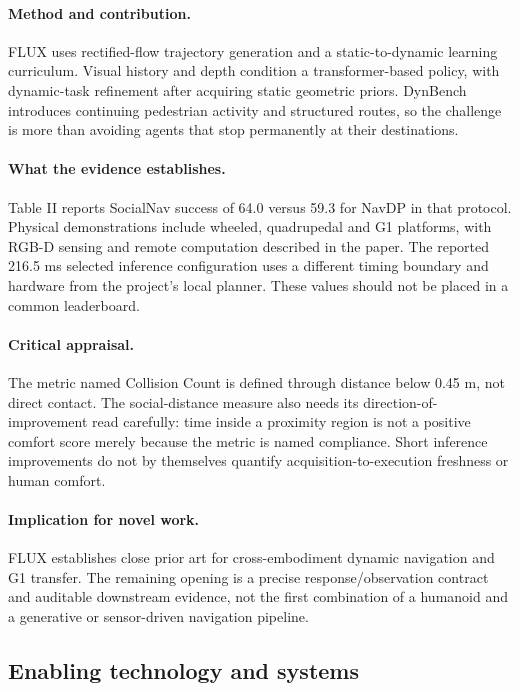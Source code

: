 \paragraph{Method and contribution.} FLUX uses rectified-flow trajectory generation and a static-to-dynamic learning curriculum. Visual history and depth condition a transformer-based policy, with dynamic-task refinement after acquiring static geometric priors. DynBench introduces continuing pedestrian activity and structured routes, so the challenge is more than avoiding agents that stop permanently at their destinations.

\paragraph{What the evidence establishes.} Table II reports SocialNav success of 64.0 versus 59.3 for NavDP in that protocol. Physical demonstrations include wheeled, quadrupedal and G1 platforms, with RGB-D sensing and remote computation described in the paper. The reported 216.5 ms selected inference configuration uses a different timing boundary and hardware from the project's local planner. These values should not be placed in a common leaderboard.

\paragraph{Critical appraisal.} The metric named Collision Count is defined through distance below 0.45 m, not direct contact. The social-distance measure also needs its direction-of-improvement read carefully: time inside a proximity region is not a positive comfort score merely because the metric is named compliance. Short inference improvements do not by themselves quantify acquisition-to-execution freshness or human comfort.

\paragraph{Implication for novel work.} FLUX establishes close prior art for cross-embodiment dynamic navigation and G1 transfer. The remaining opening is a precise response/observation contract and auditable downstream evidence, not the first combination of a humanoid and a generative or sensor-driven navigation pipeline.

\subsection{Enabling technology and systems}
